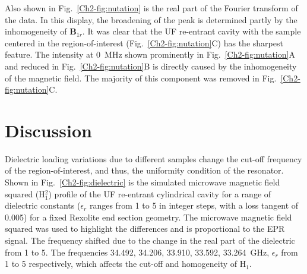 Also shown in Fig.~\ref{Ch2-fig:nutation} is the real part of the Fourier transform of the data. In this display, the broadening of the peak is determined partly by the inhomogeneity of $\mathbf{B}_{1r}$. \cite{pulsejeschke} It was clear that the UF re-entrant \cylTE{} cavity with the sample centered in the region-of-interest (Fig.~\ref{Ch2-fig:nutation}C) has the sharpest feature. The intensity at 0~MHz shown prominently in Fig.~\ref{Ch2-fig:nutation}A and reduced in Fig.~\ref{Ch2-fig:nutation}B is directly caused by the inhomogeneity of the magnetic field. The majority of this component was removed in Fig.~\ref{Ch2-fig:nutation}C. 

\section{Discussion}

Dielectric loading variations due to different samples change the cut-off frequency of the region-of-interest, and thus, the uniformity condition of the resonator. Shown in Fig.~\ref{Ch2-fig:dielectric} is the simulated microwave magnetic field squared (H$^2_1$) profile of the UF re-entrant cylindrical \cylTE{} cavity for a range of dielectric constants ($\epsilon_r$ ranges from 1 to 5 in integer steps, with a loss tangent of 0.005) for a fixed Rexolite end section geometry. The microwave magnetic field squared was used to highlight the differences and is proportional to the EPR signal. The frequency shifted due to the change in the real part of the dielectric from 1 to 5. The frequencies  34.492, 34.206, 33.910, 33.592, 33.264~GHz, $\epsilon_r$ from 1 to 5 respectively, which affects the cut-off and homogeneity of H$_1$. 

